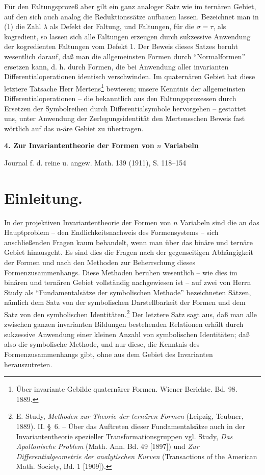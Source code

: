 \documentclass[11pt]{article}
\begin{document}
Für den Faltungsprozeß aber gilt ein ganz analoger Satz wie im ternären Gebiet, auf den sich auch analog die Reduktionssätze aufbauen lassen. Bezeichnet man in (1) die Zahl $\lambda$ als Defekt der Faltung, und Faltungen, für die $\sigma=\tau$, als kogredient, so lassen sich alle Faltungen erzeugen durch sukzessive Anwendung der kogredienten Faltungen vom Defekt 1. Der Beweis dieses Satzes beruht wesentlich darauf, daß man die allgemeinsten Formen durch ``Normalformen'' ersetzen kann, d. h. durch Formen, die bei Anwendung aller invarianten Differentialoperationen identisch verschwinden. Im quaternären Gebiet hat diese letztere Tatsache Herr Mertens\footnote{Über invariante Gebilde quaternärer Formen. Wiener Berichte. Bd. 98. 1889.} bewiesen; unsere Kenntnis der allgemeinsten Differentialoperationen -- die bekanntlich aus den Faltungsprozessen durch Ersetzen der Symbolreihen durch Differentialsymbole hervorgehen -- gestattet uns, unter Anwendung der Zerlegungsidentität den Mertensschen Beweis fast wörtlich auf das $n$-äre Gebiet zu übertragen.

\clearpage
\begin{center}
{\Large\bfseries 4. Zur Invariantentheorie der Formen von $n$ Variabeln}\par
\vspace{1.2em}
Journal f. d. reine u. angew. Math. 139 (1911), S. 118--154
\end{center}

\section*{Einleitung.}
In der projektiven Invariantentheorie der Formen von $n$ Variabeln sind die an das Hauptproblem -- den Endlichkeitsnachweis des Formensystems -- sich anschließenden Fragen kaum behandelt, wenn man über das binäre und ternäre Gebiet hinausgeht. Es sind dies die Fragen nach der gegenseitigen Abhängigkeit der Formen und nach den Methoden zur Beherrschung dieses Formenzusammenhangs. Diese Methoden beruhen wesentlich -- wie dies im binären und ternären Gebiet vollständig nachgewiesen ist -- auf zwei von Herrn Study als ``Fundamentalsätze der symbolischen Methode'' bezeichneten Sätzen, nämlich dem Satz von der symbolischen Darstellbarkeit der Formen und dem Satz von den symbolischen Identitäten.\footnote{E. Study, \emph{Methoden zur Theorie der ternären Formen} (Leipzig, Teubner, 1889). II. \S\ 6. -- Über das Auftreten dieser Fundamentalsätze auch in der Invariantentheorie spezieller Transformationsgruppen vgl. Study, \emph{Das Apollonische Problem} (Math. Ann. Bd. 49 [1897]) und \emph{Zur Differentialgeometrie der analytischen Kurven} (Transactions of the American Math. Society, Bd. 1 [1909]).} Der letztere Satz sagt aus, daß man alle zwischen ganzen invarianten Bildungen bestehenden Relationen erhält durch sukzessive Anwendung einer kleinen Anzahl von symbolischen Identitäten; daß also die symbolische Methode, und nur diese, die Kenntnis des Formenzusammenhangs gibt, ohne aus dem Gebiet des Invarianten herauszutreten.
\end{document}

